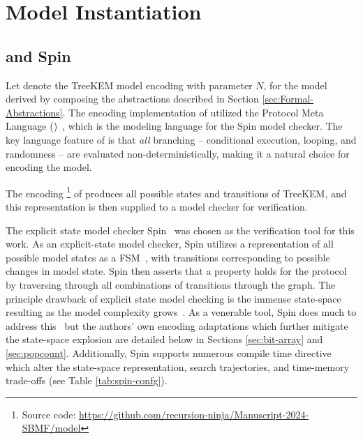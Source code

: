 \documentclass[runningheads]{llncs}
\newcommand{\Abrev}[1]{\gls{#1}}
\begin{document}
\section{Model Instantiation}

\subsection{\Promela and Spin}

\newcommand\dblwrr{\wr\mkern-2mu\wr}

Let  denote the TreeKEM model encoding with parameter $N$, for the model derived by composing the abstractions described in Section \ref{sec:Formal-Abstractions}.
The encoding implementation of  utilized the Protocol Meta Language (\Promela)~\cite{HolzmannSpinBook2003}, 
which is the modeling language for the Spin model checker. 
The key language feature of \Promela is that \emph{all} branching -- conditional execution, looping, and randomness -- are evaluated non-deterministically, making it a natural choice for encoding the model.

The \Promela encoding \footnote{Source code: \url{https://github.com/recursion-ninja/Manuscript-2024-SBMF/model}} of  produces all possible states and transitions of TreeKEM, and this representation is then supplied to a model checker for verification.


The explicit state model checker Spin~\cite{HolzmannSpinBook2003} was chosen as the verification tool for this work.
As an explicit-state model checker, Spin utilizes a representation of all possible model states as a \Abrev{FSM}~\cite{clarke1981design}, with transitions corresponding to possible changes in model state.
Spin then asserts that a property holds for the protocol by traversing through all combinations of transitions through the graph.
The principle drawback of explicit state model checking is the immense state-space resulting as the model complexity grows~\cite{burch1992symbolic}.
As a venerable tool, Spin does much to address this~\cite{rudin1987limits} but the authors' own encoding adaptations which further mitigate the state-space explosion are detailed below in Sections \ref{sec:bit-array} and \ref{sec:popcount}.
Additionally, Spin supports numerous compile time directive which alter the state-space representation, search trajectories, and time-memory trade-offs (see Table \ref{tab:spin-confg}).
\end{document}
